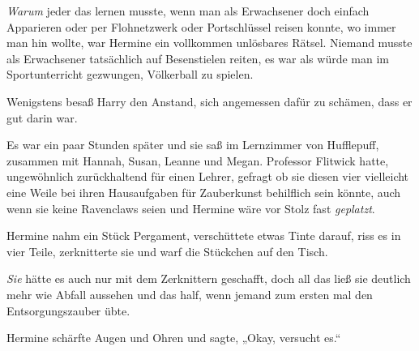 \emph{Warum} jeder das lernen musste, wenn man als Erwachsener doch einfach Apparieren oder per Flohnetzwerk oder Portschlüssel reisen konnte, wo immer man hin wollte, war Hermine ein vollkommen unlösbares Rätsel. Niemand musste als Erwachsener tatsächlich auf Besenstielen reiten, es war als würde man im Sportunterricht gezwungen, Völkerball zu spielen.

Wenigstens besaß Harry den Anstand, sich angemessen dafür zu schämen, dass er gut darin war.

\later

Es war ein paar Stunden später und sie saß im Lernzimmer von Hufflepuff, zusammen mit Hannah, Susan, Leanne und Megan. Professor Flitwick hatte, ungewöhnlich zurückhaltend für einen Lehrer, gefragt ob sie diesen vier vielleicht eine Weile bei ihren Hausaufgaben für Zauberkunst behilflich sein könnte, auch wenn sie keine Ravenclaws seien und Hermine wäre vor Stolz fast \emph{geplatzt}.

Hermine nahm ein Stück Pergament, verschüttete etwas Tinte darauf, riss es in vier Teile, zerknitterte sie und warf die Stückchen auf den Tisch.

\emph{Sie} hätte es auch nur mit dem Zerknittern geschafft, doch all das ließ sie deutlich mehr wie Abfall aussehen und das half, wenn jemand zum ersten mal den Entsorgungszauber übte.

Hermine schärfte Augen und Ohren und sagte, „Okay, versucht es.“

